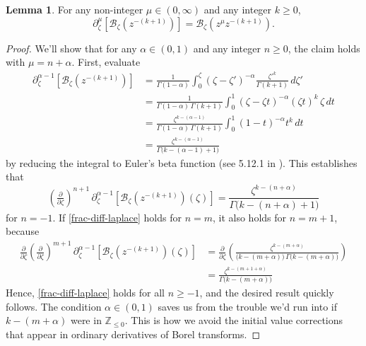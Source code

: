 \documentclass{article}
\theoremstyle{definition}
\newcommand{\Z}{\mathbb{Z}}
\newcommand{\borel}{\mathcal{B}}
\newtheorem{lemma}[definition]{Lemma}
\begin{document}
\begin{lemma}\label{lem:frac-deriv-Borel}
For any non-integer $\mu \in (0, \infty)$ and any integer $k \ge 0$,
\[ \partial^\mu_{\zeta } \left[ \borel_\zeta \left(z^{-(k+1)}\right) \right] =  \borel_\zeta \left(z^\mu z^{-(k+1)}\right). \]
\end{lemma}
\begin{proof}
We'll show that for any $\alpha \in (0, 1)$ and any integer $n \ge 0$, the claim holds with $\mu = n + \alpha$. First, evaluate
\begin{align*}
\partial^{\alpha-1}_{\zeta} \left[ \borel_\zeta \left(z^{-(k+1)}\right) \right] & = \frac{1}{\Gamma(1-\alpha)} \int_0^\zeta (\zeta-\zeta')^{-\alpha} \frac{{\zeta'}^k}{\Gamma(k+1)}\,d\zeta' \\
& = \frac{1}{\Gamma(1-\alpha)\,\Gamma(k+1)} \int_0^1 (\zeta-\zeta t)^{-\alpha} (\zeta t)^k\,\zeta\,dt \\
& = \frac{\zeta^{k-(\alpha-1)}}{\Gamma(1-\alpha)\,\Gamma(k+1)} \int_0^1 (1-t)^{-\alpha} t^k\,dt \\
& = \frac{\zeta^{k-(\alpha-1)}}{\Gamma\big(k-(\alpha-1)+1\big)}
\end{align*}
by reducing the integral to Euler's beta function (see 5.12.1 in \cite{dlmf}). This establishes that
\begin{equation}\label{frac-diff-laplace}
\left(\tfrac{\partial}{\partial \zeta}\right)^{n+1}\,\partial^{\alpha-1}_{\zeta } \left[ \borel_\zeta \left(z^{-(k+1)}\right)(\zeta) \right] = \frac{\zeta^{k-(n+\alpha)}}{\Gamma\big(k-(n+\alpha)+1\big)}
\end{equation}
for $n = -1$. If \eqref{frac-diff-laplace} holds for $n = m$, it also holds for $n = m+1$, because
\begin{align*}
\tfrac{\partial}{\partial \zeta} \left(\tfrac{\partial}{\partial \zeta}\right)^{m+1}\,\partial^{\alpha-1}_{\zeta} \left[ \borel_\zeta \left(z^{-(k+1)}\right)(\zeta) \right] & = \tfrac{\partial}{\partial \zeta} \left( \frac{\zeta^{k-(m+\alpha)}}{\big(k-(m+\alpha)\big)\,\Gamma\big(k-(m+\alpha)\big)} \right) \\
& = \frac{\zeta^{k-(m+1+\alpha)}}{\Gamma\big(k-(m+\alpha)\big)}
\end{align*}
Hence, \eqref{frac-diff-laplace} holds for all $n \ge -1$, and the desired result quickly follows. The condition $\alpha \in (0, 1)$ saves us from the trouble we'd run into if $k-(m+\alpha)$ were in $\Z_{\le 0}$. This is how we avoid the initial value corrections that appear in ordinary derivatives of Borel transforms.
\end{proof}
\end{document}
